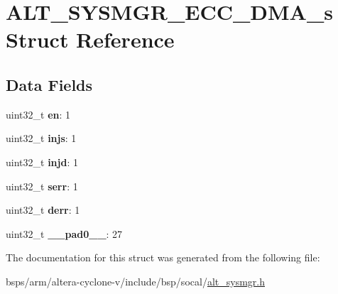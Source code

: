 \hypertarget{structALT__SYSMGR__ECC__DMA__s}{}\section{A\+L\+T\+\_\+\+S\+Y\+S\+M\+G\+R\+\_\+\+E\+C\+C\+\_\+\+D\+M\+A\+\_\+s Struct Reference}
\label{structALT__SYSMGR__ECC__DMA__s}
\subsection*{Data Fields}
\begin{DoxyCompactItemize}
\item 
\mbox{\label{structALT__SYSMGR__ECC__DMA__s_ac8317ce6957e4f82643ae6f7756934ce}} 
uint32\+\_\+t {\bfseries en}\+: 1
\item 
\mbox{\label{structALT__SYSMGR__ECC__DMA__s_a2682b75adcfb455da2ee1307a052c31b}} 
uint32\+\_\+t {\bfseries injs}\+: 1
\item 
\mbox{\label{structALT__SYSMGR__ECC__DMA__s_a6a9cfbdb376fab377d49cf8d765d1609}} 
uint32\+\_\+t {\bfseries injd}\+: 1
\item 
\mbox{\label{structALT__SYSMGR__ECC__DMA__s_a54530e8a6838ba76ce97e51b8a6aabb4}} 
uint32\+\_\+t {\bfseries serr}\+: 1
\item 
\mbox{\label{structALT__SYSMGR__ECC__DMA__s_a9f5d1d0e95989368cb055f1e5a596159}} 
uint32\+\_\+t {\bfseries derr}\+: 1
\item 
\mbox{\label{structALT__SYSMGR__ECC__DMA__s_af2b016fe74474d9e616068ff1b1b75bf}} 
uint32\+\_\+t {\bfseries \+\_\+\+\_\+pad0\+\_\+\+\_\+}\+: 27
\end{DoxyCompactItemize}


The documentation for this struct was generated from the following file\+:\begin{DoxyCompactItemize}
\item 
bsps/arm/altera-\/cyclone-\/v/include/bsp/socal/\mbox{\hyperlink{alt__sysmgr_8h}{alt\+\_\+sysmgr.\+h}}\end{DoxyCompactItemize}
